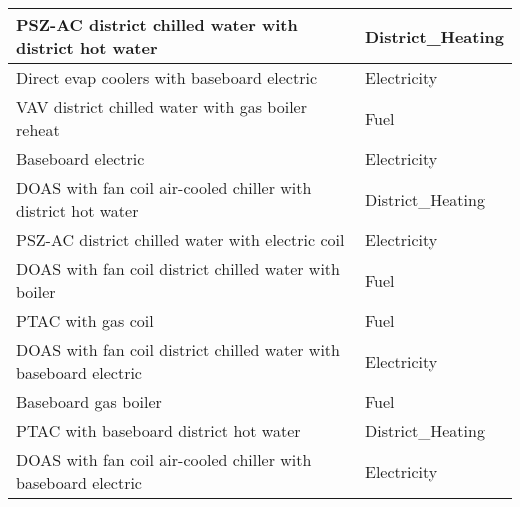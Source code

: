 \begin{table}[hb!]
\begin{tabular}{|l|l|}
PSZ-AC district chilled water with district hot water       & District\_Heating              \\ \hline
Direct evap coolers with baseboard electric                 & Electricity                    \\ \hline
VAV district chilled water with gas boiler reheat           & Fuel                           \\ \hline
Baseboard electric                                          & Electricity                    \\ \hline
DOAS with fan coil air-cooled chiller with district hot water     & District\_Heating        \\ \hline
PSZ-AC district chilled water with electric coil            & Electricity                    \\ \hline
DOAS with fan coil district chilled water with boiler       & Fuel                           \\ \hline
PTAC with gas coil                                          & Fuel                           \\ \hline
DOAS with fan coil district chilled water with baseboard electric & Electricity              \\ \hline
Baseboard gas boiler                                        & Fuel                           \\ \hline
PTAC with baseboard district hot water                      & District\_Heating              \\ \hline
DOAS with fan coil air-cooled chiller with baseboard electric     & Electricity       \\ \hline
\end{tabular}
\end{table}